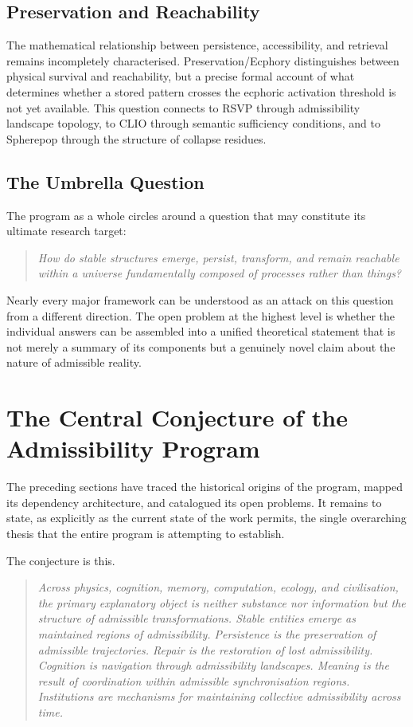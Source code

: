 \documentclass[12pt, twoside]{article}
\begin{document}
\subsection{Preservation and Reachability}

The mathematical relationship between persistence, accessibility, and
retrieval remains incompletely characterised. Preservation/Ecphory
distinguishes between physical survival and reachability, but a precise
formal account of what determines whether a stored pattern crosses the
ecphoric activation threshold is not yet available. This question connects to
RSVP through admissibility landscape topology, to CLIO through semantic
sufficiency conditions, and to Spherepop through the structure of collapse
residues.

\subsection{The Umbrella Question}

The program as a whole circles around a question that may constitute its
ultimate research target:

\begin{quote}
\itshape
How do stable structures emerge, persist, transform, and remain reachable
within a universe fundamentally composed of processes rather than things?
\end{quote}

Nearly every major framework can be understood as an attack on this question
from a different direction. The open problem at the highest level is whether
the individual answers can be assembled into a unified theoretical statement
that is not merely a summary of its components but a genuinely novel claim
about the nature of admissible reality.

\section{The Central Conjecture of the Admissibility Program}

The preceding sections have traced the historical origins of the program,
mapped its dependency architecture, and catalogued its open problems. It
remains to state, as explicitly as the current state of the work permits, the
single overarching thesis that the entire program is attempting to establish.

The conjecture is this.

\begin{quote}
\itshape
Across physics, cognition, memory, computation, ecology, and civilisation,
the primary explanatory object is neither substance nor information but the
structure of admissible transformations. Stable entities emerge as
maintained regions of admissibility. Persistence is the preservation of
admissible trajectories. Repair is the restoration of lost admissibility.
Cognition is navigation through admissibility landscapes. Meaning is the
result of coordination within admissible synchronisation regions. Institutions
are mechanisms for maintaining collective admissibility across time.
\end{quote}
\end{document}
